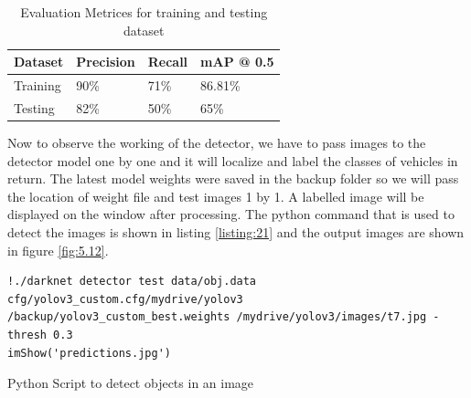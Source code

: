 \begin{table}[H]
	\caption{Evaluation Metrices for training and testing dataset}
	\label{table:5.2}
	  \begin{center}
		\scalebox{1.1}
		{\begin{tabular}{|l |l |l |l |}
	    \hline
	    Dataset   & Precision & Recall &  mAP @ 0.5
		\\ \hline
		Training & 90\% & 71\% & 86.81\%
		\\ \hline
		Testing  & 82\%& 50\% & 65\%
		\\ \hline  
		\end{tabular}}
	  \end{center}
\end{table}
\noindent
Now to observe the working of the detector, we have to pass images to the detector model one by one and it will localize and label the classes of vehicles in return. The latest model weights were saved in the backup folder so we will pass the location of weight file and test images 1 by 1. A labelled image will be displayed on the window after processing. The python command that is used to detect the images is shown in listing \ref{listing:21} and the output images are shown in figure \ref{fig:5.12}.
\begin{longlisting}
\begin{verbatim}
!./darknet detector test data/obj.data cfg/yolov3_custom.cfg/mydrive/yolov3
/backup/yolov3_custom_best.weights /mydrive/yolov3/images/t7.jpg -thresh 0.3
imShow('predictions.jpg')
\end{verbatim}
\caption{Python Script to detect objects in an image}
\label{listing:21}
\end{longlisting}
